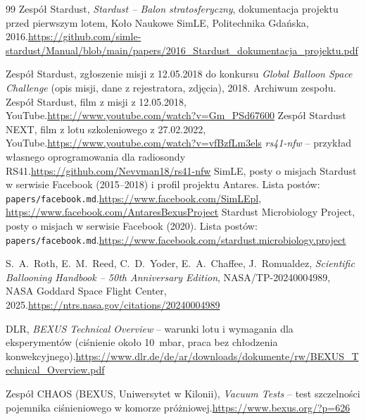 \begin{thebibliography}{99}
 Zespół Stardust, \emph{Stardust -- Balon stratosferyczny}, dokumentacja projektu przed pierwszym lotem, Koło Naukowe SimLE, Politechnika Gdańska, 2016.\newline\url{https://github.com/simle-stardust/Manual/blob/main/papers/2016_Stardust_dokumentacja_projektu.pdf}

 Zespół Stardust, zgłoszenie misji z 12.05.2018 do konkursu \emph{Global Balloon Space Challenge} (opis misji, dane z rejestratora, zdjęcia), 2018. Archiwum zespołu.
 Zespół Stardust, film z misji z 12.05.2018, YouTube.\newline\url{https://www.youtube.com/watch?v=Gm_PSd67600}
 Zespół Stardust NEXT, film z lotu szkoleniowego z 27.02.2022, YouTube.\newline\url{https://www.youtube.com/watch?v=vfBzfLm3els}
 \emph{rs41-nfw} -- przykład własnego oprogramowania dla radiosondy RS41.\newline\url{https://github.com/Nevvman18/rs41-nfw}
 SimLE, posty o misjach Stardust w serwisie Facebook (2015--2018) i profil projektu Antares. Lista postów: \texttt{papers/facebook.md}.\newline\url{https://www.facebook.com/SimLEpl}, \url{https://www.facebook.com/AntaresBexusProject}
 Stardust Microbiology Project, posty o misjach w serwisie Facebook (2020). Lista postów: \texttt{papers/facebook.md}.\newline\url{https://www.facebook.com/stardust.microbiology.project}

 S.~A.~Roth, E.~M.~Reed, C.~D.~Yoder, E.~A.~Chaffee, J.~Romualdez, \emph{Scientific Ballooning Handbook -- 50th Anniversary Edition}, NASA/TP-20240004989, NASA Goddard Space Flight Center, 2025.\newline\url{https://ntrs.nasa.gov/citations/20240004989}

 DLR, \emph{BEXUS Technical Overview} -- warunki lotu i wymagania dla eksperymentów (ciśnienie około \SI{10}{mbar}, praca bez chłodzenia konwekcyjnego).\newline\url{https://www.dlr.de/de/ar/downloads/dokumente/rw/BEXUS_Technical_Overview.pdf}

 Zespół CHAOS (BEXUS, Uniwersytet w Kilonii), \emph{Vacuum Tests} -- test szczelności pojemnika ciśnieniowego w komorze próżniowej.\newline\url{https://www.bexus.org/?p=626}


\end{thebibliography}
